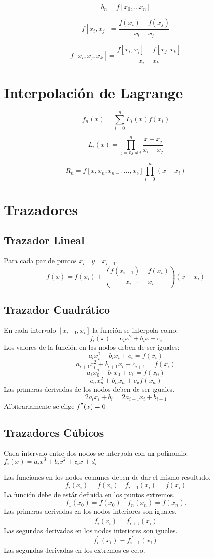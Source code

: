     $$
    b_n = f[x_0,...x_n]
    $$
    
    $$
  		f[x_i, x_j] = \frac{ f(x_i) - f(x_j) }{ x_i - x_j}
    $$
    
    $$
  		f[x_i, x_j,x_k ] = \frac{ f[x_i,x_j]- f[x_j,x_k]}{ x_i -x_k }
    $$
    \section{Interpolación de Lagrange}
     
    $$
    	f_n(x) = \sum_{i=0}^n L_i(x)f(x_i)
    $$
    
	$$
    	L_i(x) = \prod_{j=0 j \not = i}^n \frac{x-x_j}{x_i-x_j}
	$$
    
   	$$ 
    R_n = f [x,x_n,x_{n-},...,x_o] \prod_{i=0}^n (x-x_i)
    $$
    \section{Trazadores}
    \subsection{Trazador Lineal} Para cada par de puntos $ x_i \quad y \quad  x_{i+1} $.
    $$
    	f(x) =f(x_i) + ( \frac{f(x_{i+1}) - f(x_i)}{x_{i+1}-x_i })(x-x_i)
    $$
    \subsection{Trazador Cuadrático}
    En cada  intervalo  $ [x_{i-1},x_i] $ la función se interpola como:
     $$
     f_i(x) = a_{i}x^2 + b_{i}x + c_i
     $$  
     Los  valores de la función en los nodos deben de ser iguales:
     $$
     	a_{i}x_{i}^2 + b_{i}x_{i} + c_i = f(x_i)
     $$
     $$
     	a_{i+1}x_{i}^2 + b_{i+1}x_{i} + c_{i+1} = f(x_i)
     $$
     $$
     	a_{1}x_{0}^2 + b_{1}x_{0} + c_1= f(x_0)        
     $$
     $$
     	a_{n}x_{n}^2 + b_{n}x_{n} + c_n f(x_n)
     $$
     Las primeras derivadas de los nodos deben de ser iguales.
     $$
     2a_ix_i + b_i = 2a_{i+1}x_i + b_{i+1}
     $$
     Albitrariamente se elige $f^{"}(x) =0$
    
    \subsection{Trazadores Cúbicos}
    Cada intervalo entre dos nodos se  interpola con un polinomio: $ f_i(x)= a_ix^3 + b_ix^2 + c_ix +d_i$
    
    Las funciones en los nodos comunes deben de dar el mismo resultado.
$$
 f_i(x_i ) = f(x_i) \quad f_{i+1}(x_i) = f(x_i)
$$
La función debe de estár definida en los puntos extremos. 
$$
	f_1(x_0) = f(x_0)  \quad f_n(x_n) = f(x_n).
$$
Las primeras derivadas en los nodos interiores son iguales.
$$
	f_i^{\prime }(x_i) = f_{i+1}^{\prime}(x_i)
$$
Las segundas derivadas en los nodos interiores son iguales.
$$
	f_i^{\prime \prime }(x_i) = f_{i+1}^{\prime \prime}(x_i)
$$
 Las segundas derivadas en los extremos es cero.
 
